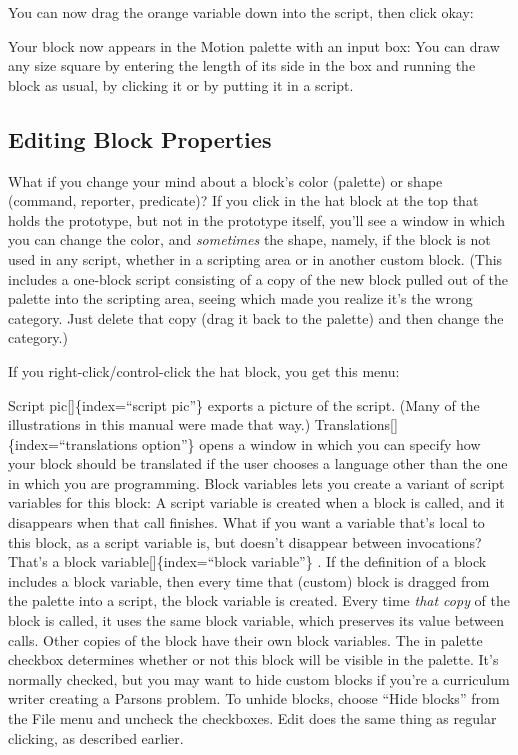 \documentclass[
  letterpaper,
]{book}
\begin{document}
You can now drag the orange variable down into the script, then click
okay:

Your block now appears in the Motion palette with an input box: You can
draw any size square by entering the length of its side in the box and
running the block as usual, by clicking it or by putting it in a script.

\subsection{Editing Block Properties}\label{editing-block-properties}

What if you change your mind about a block's color (palette) or shape
(command, reporter, predicate)? If you click in the hat block at the top
that holds the prototype, but not in the prototype itself, you'll see a
window in which you can change the color, and \emph{sometimes} the
shape, namely, if the block is not used in any script, whether in a
scripting area or in another custom block. (This includes a one-block
script consisting of a copy of the new block pulled out of the palette
into the scripting area, seeing which made you realize it's the wrong
category. Just delete that copy (drag it back to the palette) and then
change the category.)

If you right-click/control-click the hat block, you get this menu:

Script pic{[}{]}\{index=``script pic''\} exports a picture of the
script. (Many of the illustrations in this manual were made that way.)
Translations{[}{]}\{index=``translations option''\} opens a window in
which you can specify how your block should be translated if the user
chooses a language other than the one in which you are programming.
Block variables lets you create a variant of script variables for this
block: A script variable is created when a block is called, and it
disappears when that call finishes. What if you want a variable that's
local to this block, as a script variable is, but doesn't disappear
between invocations? That's a block variable{[}{]}\{index=``block
variable''\} . If the definition of a block includes a block variable,
then every time that (custom) block is dragged from the palette into a
script, the block variable is created. Every time \emph{that copy} of
the block is called, it uses the same block variable, which preserves
its value between calls. Other copies of the block have their own block
variables. The in palette checkbox determines whether or not this block
will be visible in the palette. It's normally checked, but you may want
to hide custom blocks if you're a curriculum writer creating a Parsons
problem. To unhide blocks, choose ``Hide blocks'' from the File menu and
uncheck the checkboxes. Edit does the same thing as regular clicking, as
described earlier.
\end{document}
